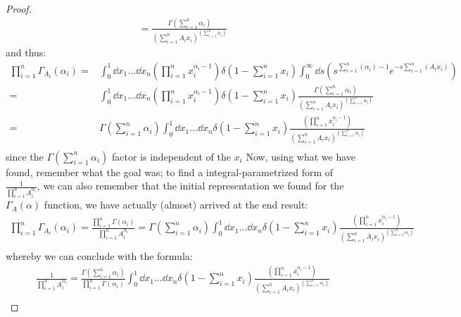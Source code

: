 \documentclass[a4paper,twoside]{article}
\begin{document}
\begin{proof}
\begin{align*}
= \frac{\Gamma \left( \sum_{i=1}^{n} \alpha_{i} \right)}{\left( \sum_{i=1}^{n}A_{i}x_{i} \right)^{\left( \sum_{i=1}^{n} \alpha_{i} \right)}} 
\end{align*}
and thus:
\begin{align*}
\prod_{i=1}^{n}\Gamma_{A_{i}}(\alpha_{i}) 
=&  \int_{0}^{1} \dd{x_{1}}...\dd{x_{n}} \left( \prod_{i=1}^{n} x_{i}^{\alpha_{i} - 1} \right) \delta \left(1 - \sum_{i=1}^{n}x_{i}\right) 
\int_{0}^{\infty} \dd{s} \left( s^{\sum_{i=1}^{n}(\alpha_{i}) - 1} e^{-s\sum_{i=1}^{n}(A_{i} x_{i})} \right) \\
=&  \int_{0}^{1} \dd{x_{1}}...\dd{x_{n}} \left( \prod_{i=1}^{n} x_{i}^{\alpha_{i} - 1} \right) \delta \left(1 - \sum_{i=1}^{n}x_{i}\right) 
\frac{\Gamma \left( \sum_{i=1}^{n} \alpha_{i} \right)}{\left( \sum_{i=1}^{n}A_{i}x_{i} \right)^{\left( \sum_{i=1}^{n} \alpha_{i} \right)}} \\
=& \Gamma \left( \sum_{i=1}^{n} \alpha_{i} \right)
 \int_{0}^{1} \dd{x_{1}}...\dd{x_{n}} 
\delta \left(1 - \sum_{i=1}^{n}x_{i}\right) 
\frac{\left( \prod_{i=1}^{n} x_{i}^{\alpha_{i} - 1} \right)}{\left( \sum_{i=1}^{n}A_{i}x_{i} \right)^{\left( \sum_{i=1}^{n} \alpha_{i} \right)}} \\
\end{align*}
since the $\Gamma \left( \sum_{i=1}^{n} \alpha_{i} \right)$ factor is independent of the $x_{i}$
Now, using what we have found, remember what the goal was; to find a integral-parametrized form of $\frac{1}{\prod_{i=1}^{n}A_{i}^{\alpha_{i}}}$, we can also remember that the initial representation we found for the $\Gamma_{A}(\alpha)$ function, we have actually (almost) arrived at the end result:
\begin{align*}
\prod_{i=1}^{n}\Gamma_{A_{i}}(\alpha_{i}) 
= \frac{\prod_{i=1}^{n}\Gamma(\alpha_{i})}{\prod_{i=1}^{n}A_{i}^{\alpha_{i}}}
= \Gamma \left( \sum_{i=1}^{n} \alpha_{i} \right)
 \int_{0}^{1} \dd{x_{1}}...\dd{x_{n}} 
\delta \left(1 - \sum_{i=1}^{n}x_{i}\right) 
\frac{\left( \prod_{i=1}^{n} x_{i}^{\alpha_{i} - 1} \right)}{\left( \sum_{i=1}^{n}A_{i}x_{i} \right)^{\left( \sum_{i=1}^{n} \alpha_{i} \right)}} \\
\end{align*}
whereby we can conclude with the formula:
\begin{align*}
\frac{1}{\prod_{i=1}^{n}A_{i}^{\alpha_{i}}}
= \frac{\Gamma \left( \sum_{i=1}^{n} \alpha_{i} \right)}{\prod_{i=1}^{n}\Gamma(\alpha_{i})}
 \int_{0}^{1} \dd{x_{1}}...\dd{x_{n}} 
\delta \left(1 - \sum_{i=1}^{n}x_{i}\right) 
\frac{\left( \prod_{i=1}^{n} x_{i}^{\alpha_{i} - 1} \right)}{\left( \sum_{i=1}^{n}A_{i}x_{i} \right)^{\left( \sum_{i=1}^{n} \alpha_{i} \right)}} \\
\end{align*}
\end{proof}


 

\end{document}
